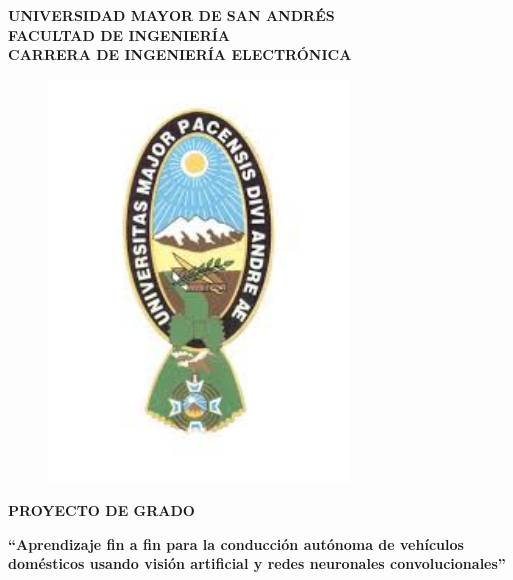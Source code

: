 \begin{titlepage}
    \begin{center}
    \vspace*{-0.5in}
    \begin{large}
    \textbf{UNIVERSIDAD MAYOR DE SAN ANDRÉS}\\
    \vspace*{0.15in}
    \textbf{FACULTAD DE INGENIERÍA}\\
    \vspace*{0.15in}
    \textbf{CARRERA DE INGENIERÍA ELECTRÓNICA}\\
    \vspace*{0.1in}
    \end{large}
    \begin{figure}[htb]
    \begin{center}
    \includegraphics[width=8cm]{img/umsa.jpg}
    \end{center}
    \end{figure}
    \begin{Large}
    \textbf{PROYECTO DE GRADO} 
    \end{Large}
    \vspace*{0.4in}
    
    \begin{normalsize}
    \textbf{``Aprendizaje fin a fin para la conducción autónoma de vehículos domésticos usando visión artificial y redes neuronales convolucionales''} \\
    \end{normalsize}
    

\end{center}
\end{titlepage}

